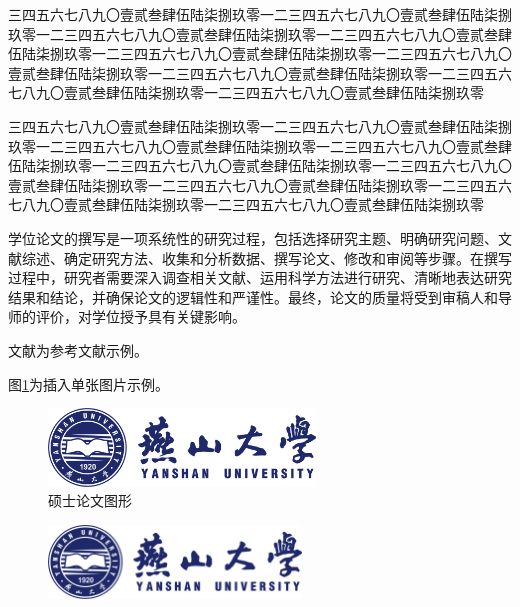 \documentclass[master,academic]{ysuthesis} %
\begin{document}
		三四五六七八九〇壹贰叁肆伍陆柒捌玖零一二三四五六七八九〇壹贰叁肆伍陆柒捌玖零一二三四五六七八九〇壹贰叁肆伍陆柒捌玖零一二三四五六七八九〇壹贰叁肆伍陆柒捌玖零一二三四五六七八九〇壹贰叁肆伍陆柒捌玖零一二三四五六七八九〇壹贰叁肆伍陆柒捌玖零一二三四五六七八九〇壹贰叁肆伍陆柒捌玖零一二三四五六七八九〇壹贰叁肆伍陆柒捌玖零一二三四五六七八九〇壹贰叁肆伍陆柒捌玖零

		三四五六七八九〇壹贰叁肆伍陆柒捌玖零一二三四五六七八九〇壹贰叁肆伍陆柒捌玖零一二三四五六七八九〇壹贰叁肆伍陆柒捌玖零一二三四五六七八九〇壹贰叁肆伍陆柒捌玖零一二三四五六七八九〇壹贰叁肆伍陆柒捌玖零一二三四五六七八九〇壹贰叁肆伍陆柒捌玖零一二三四五六七八九〇壹贰叁肆伍陆柒捌玖零一二三四五六七八九〇壹贰叁肆伍陆柒捌玖零一二三四五六七八九〇壹贰叁肆伍陆柒捌玖零

		学位论文的撰写是一项系统性的研究过程，包括选择研究主题、明确研究问题、文献综述、确定研究方法、收集和分析数据、撰写论文、修改和审阅等步骤。在撰写过程中，研究者需要深入调查相关文献、运用科学方法进行研究、清晰地表达研究结果和结论，并确保论文的逻辑性和严谨性。最终，论文的质量将受到审稿人和导师的评价，对学位授予具有关键影响。

		文献\cite{texbook,latex:companion,latex2e,knuth:1984,lesk:1977}为参考文献示例。

		图\ref{fig:ysu_logo}为插入单张图片示例。

			\begin{figure}[!ht]
				\centering
				\includegraphics[width=2.79in]{ysu_logo}
				\caption{硕士论文图形}
				\label{fig:ysu_logo}
			\end{figure}
			\begin{figure}[!ht]
				\centering
				\includegraphics[width=0.6\textwidth]{ysu_logo}
				\label{ysulogo}
            \end{figure}
\end{document}
